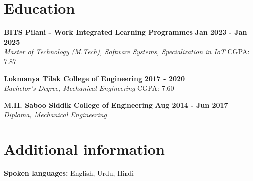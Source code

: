 \documentclass[10pt,a4paper]{article}
\newcommand{\resumeEntry}[4]{
    \textbf{#1} \hfill \textbf{#2}\\
    \textit{#3} \hfill #4
}
\begin{document}
\section{Education}

\resumeEntry
{BITS Pilani - Work Integrated Learning Programmes}
{Jan 2023 - Jan 2025}
{Master of Technology (M.Tech), Software Systems, Specialization in IoT}
{CGPA: 7.87}

\vspace{3pt}

\resumeEntry
{Lokmanya Tilak College of Engineering}
{2017 - 2020}
{Bachelor's Degree, Mechanical Engineering}
{CGPA: 7.60}

\vspace{3pt}

\resumeEntry
{M.H. Saboo Siddik College of Engineering}
{Aug 2014 - Jun 2017}
{Diploma, Mechanical Engineering}
{}

\section{Additional information}

\textbf{Spoken languages:}
English, Urdu, Hindi
\end{document}
